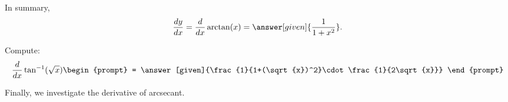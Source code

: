 \documentclass{ximera}
\begin{document}
\begin{theorem}
\begin{explanation}
In summary,
\[
\frac{dy}{dx} = \ddx \arctan(x) = \answer[given]{\frac{1}{1+x^2}}.
\]
\end{explanation}
\end{theorem}

\begin{question}
  Compute:
  \[
  \ddx \tan^{-1}(\sqrt{x})
  \begin{prompt}
    = \answer[given]{\frac{1}{1+(\sqrt{x})^2}\cdot\frac{1}{2\sqrt{x}}}
  \end{prompt}
  \]
\end{question}



Finally, we investigate the derivative of arcsecant.
\end{document}
